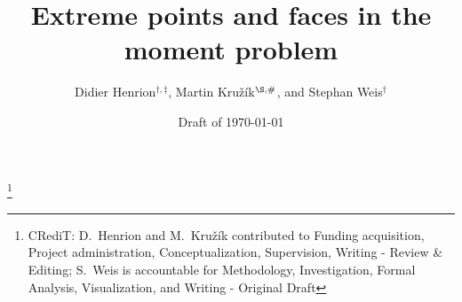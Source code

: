 \documentclass[a4paper,11pt,reqno]{amsart}
\numberwithin{equation}{section}
\theoremstyle{plain}
\theoremstyle{definition}
\begin{document}
%
\title{Extreme points and faces in the moment problem}
%
\author[Didier Henrion \and Martin Kru\v{z}\'ik \and Stephan Weis]%
{Didier Henrion$^{\dagger,\ddagger}$, 
Martin Kru\v{z}\'ik$^{\S,\#}$, 
and Stephan Weis$^\dagger$}
%
\address{%
$^\dagger$Faculty of Electrical Engineering,
Czech Technical University in Prague, Czechia\\
$^\ddagger$LAAS-CNRS, 
University of Toulouse, France\\
$^\S$Institute of Information Theory and Automation,
Czech Academy of Sciences, Prague, Czechia\\
$^\#$Faculty of Civil Engineering, 
Czech Technical University in Prague, Czechia}
%
%
\thanks{CRediT: D.~Henrion and M.~Kru\v{z}\'{i}k contributed to 
Funding acquisition, Project administration, Conceptualization, Supervision, 
Writing - Review \& Editing;
S.~Weis is accountable for Methodology, Investigation, Formal Analysis, Visualization, 
and Writing - Original Draft}
%
\date{Draft of \today}
%
%
%
% 
%
%
\end{document}
